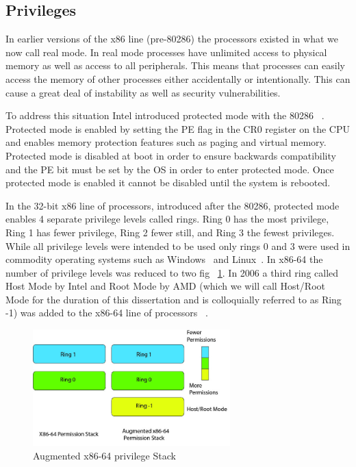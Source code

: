 \subsection{Privileges}

In earlier versions of the x86 line (pre-80286) the processors existed in what we now call real mode. In real mode processes have unlimited access to physical memory as well as access to all peripherals. This means that processes can easily access the memory of other processes either accidentally or intentionally. This can cause a great deal of instability as well as security vulnerabilities. 

To address this situation Intel introduced protected mode with the 80286 ~\cite{_iapx_1983}. Protected mode is enabled by setting the PE flag in the CR0 register on the CPU and enables memory protection features such as paging and virtual memory. Protected mode is disabled at boot in order to ensure backwards compatibility and the PE bit must be set by the OS in order to enter protected mode. Once protected mode is enabled it cannot be disabled until the system is rebooted. 


In the 32-bit x86 line of processors, introduced after the 80286, protected mode enables 4 separate privilege levels called rings. Ring 0 has the most privilege, Ring 1 has fewer privilege, Ring 2 fewer still, and Ring 3 the fewest privileges. While all privilege levels were intended to be used only rings 0 and 3 were used in commodity operating systems such as Windows~\cite{_microsoft_2014} and Linux~\cite{_Linux_archive}. In x86-64 the number of privilege levels was reduced to two fig ~\ref{PermStack}. In 2006 a third ring called Host Mode by Intel and Root Mode by AMD (which we will call Host/Root Mode for the duration of this dissertation and is colloquially referred to as Ring -1) was added to the x86-64 line of processors ~\cite{codenamed_pacifica_2005}. 



\begin{figure}\label{PermStack}
	  \centering
	  \includegraphics[width=3in]{figures/AugmentedPerm.jpg}
	  \caption{Augmented x86-64 privilege Stack}
\end{figure}


